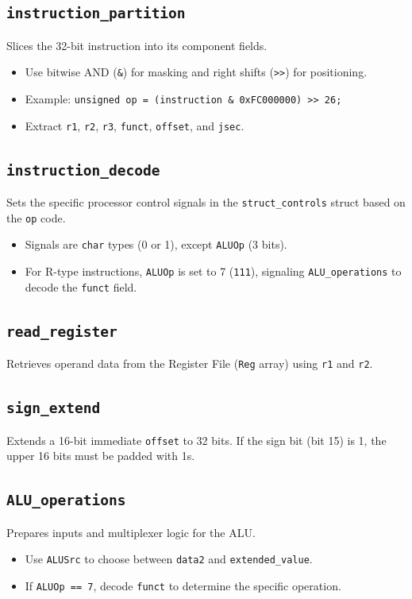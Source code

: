 \subsection{\texttt{instruction\_partition}}
Slices the 32-bit instruction into its component fields.
\begin{itemize}
    \item Use bitwise AND (\texttt{\&}) for masking and right shifts (\texttt{>>}) for positioning.
    \item Example: \texttt{unsigned op = (instruction \& 0xFC000000) >> 26;}
    \item Extract \texttt{r1}, \texttt{r2}, \texttt{r3}, \texttt{funct}, \texttt{offset}, and \texttt{jsec}.
\end{itemize}

\subsection{\texttt{instruction\_decode}}
Sets the specific processor control signals in the \texttt{struct\_controls} struct based on the \texttt{op} code.
\begin{itemize}
    \item Signals are \texttt{char} types (0 or 1), except \texttt{ALUOp} (3 bits).
    \item For R-type instructions, \texttt{ALUOp} is set to 7 (\texttt{111}), signaling \texttt{ALU\_operations} to decode the \texttt{funct} field.
\end{itemize}

\subsection{\texttt{read\_register}}
Retrieves operand data from the Register File (\texttt{Reg} array) using \texttt{r1} and \texttt{r2}.

\subsection{\texttt{sign\_extend}}
Extends a 16-bit immediate \texttt{offset} to 32 bits. If the sign bit (bit 15) is 1, the upper 16 bits must be padded with 1s.

\subsection{\texttt{ALU\_operations}}
Prepares inputs and multiplexer logic for the ALU.
\begin{itemize}
    \item Use \texttt{ALUSrc} to choose between \texttt{data2} and \texttt{extended\_value}.
    \item If \texttt{ALUOp == 7}, decode \texttt{funct} to determine the specific operation.
\end{itemize}

